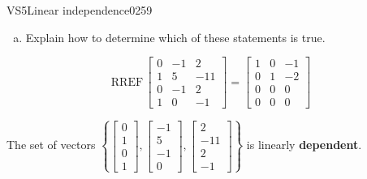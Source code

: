 \begin{exercise}{VS5}{Linear independence}{0259}
\begin{exerciseStatement}
\begin{enumerate}[(a)]
     
\item  

 Explain how to determine which of these statements is true. 

 
\end{enumerate}

     \end{exerciseStatement}
 \begin{exerciseAnswer} 

 \[
\mathrm{RREF}\, \left[\begin{array}{ccc}
0 & -1 & 2 \\
1 & 5 & -11 \\
0 & -1 & 2 \\
1 & 0 & -1
\end{array}\right] = \left[\begin{array}{ccc}
1 & 0 & -1 \\
0 & 1 & -2 \\
0 & 0 & 0 \\
0 & 0 & 0
\end{array}\right]
            \] 

 

 The set of vectors \(\left\{ \left[\begin{array}{c}
0 \\
1 \\
0 \\
1
\end{array}\right] , \left[\begin{array}{c}
-1 \\
5 \\
-1 \\
0
\end{array}\right] , \left[\begin{array}{c}
2 \\
-11 \\
2 \\
-1
\end{array}\right] \right\}\) is linearly \textbf{dependent}. 

 \end{exerciseAnswer}
 \end{exercise}


\newpage





